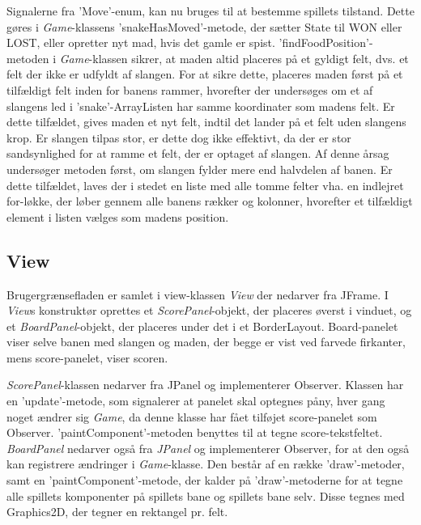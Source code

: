 Signalerne fra 'Move'-enum, kan nu bruges til at bestemme spillets tilstand. Dette gøres i \textit{Game}-klassens 'snakeHasMoved'-metode, der sætter State til WON eller LOST, eller opretter nyt mad, hvis det gamle er spist. 'findFoodPosition'-metoden i \textit{Game}-klassen sikrer, at maden altid placeres på et gyldigt felt, dvs. et felt der ikke er udfyldt af slangen. For at sikre dette, placeres maden først på et tilfældigt felt inden for banens rammer, hvorefter der undersøges om et af slangens led i 'snake'-ArrayListen har samme koordinater som madens felt. Er dette tilfældet, gives maden et nyt felt, indtil det lander på et felt uden slangens krop. Er slangen tilpas stor, er dette dog ikke effektivt, da der er stor sandsynlighed for at ramme et felt, der er optaget af slangen. Af denne årsag undersøger metoden først, om slangen fylder mere end halvdelen af banen. Er dette tilfældet, laves der i stedet en liste med alle tomme felter vha. en indlejret for-løkke, der løber gennem alle banens rækker og kolonner, hvorefter et tilfældigt element i listen vælges som madens position.

\subsection{View}
Brugergrænsefladen er samlet i view-klassen \textit{View} der nedarver fra JFrame. I \textit{View}s konstruktør oprettes et \textit{ScorePanel}-objekt, der placeres øverst i vinduet, og et \textit{BoardPanel}-objekt, der placeres under det i et BorderLayout. Board-panelet viser selve banen med slangen og maden, der begge er vist ved farvede firkanter, mens score-panelet, viser scoren.
\newline

\textit{ScorePanel}-klassen nedarver fra JPanel og implementerer Observer. Klassen har en 'update'-metode, som signalerer at panelet skal optegnes påny, hver gang noget ændrer sig \textit{Game}, da denne klasse har fået tilføjet score-panelet som Observer. 'paintComponent'-metoden benyttes til at tegne score-tekstfeltet. \textit{BoardPanel} nedarver også fra \textit{JPanel} og implementerer Observer, for at den også kan registrere ændringer i \textit{Game}-klasse. Den består af en række 'draw'-metoder, samt en 'paintComponent'-metode, der kalder på 'draw'-metoderne for at tegne alle spillets komponenter på spillets bane og spillets bane selv. Disse tegnes med Graphics2D, der tegner en rektangel pr. felt.
\newline

